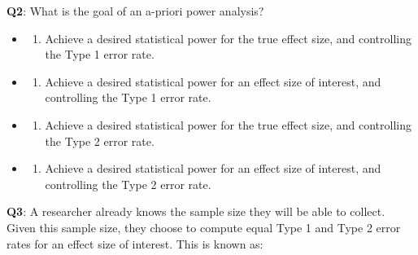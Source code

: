 \documentclass[
  letterpaper,
  DIV=11,
  numbers=noendperiod]{scrreprt}
\providecommand{\tightlist}{%
  \setlength{\itemsep}{0pt}\setlength{\parskip}{0pt}}\usepackage{longtable,booktabs,array}
\begin{document}
\textbf{Q2}: What is the goal of an a-priori power analysis?

\begin{itemize}
\item
  \begin{enumerate}
  \def\labelenumi{(\Alph{enumi})}
  \tightlist
  \item
    Achieve a desired statistical power for the true effect size, and
    controlling the Type 1 error rate.\\
  \end{enumerate}
\item
  \begin{enumerate}
  \def\labelenumi{(\Alph{enumi})}
  \setcounter{enumi}{1}
  \tightlist
  \item
    Achieve a desired statistical power for an effect size of interest,
    and controlling the Type 1 error rate.\\
  \end{enumerate}
\item
  \begin{enumerate}
  \def\labelenumi{(\Alph{enumi})}
  \setcounter{enumi}{2}
  \tightlist
  \item
    Achieve a desired statistical power for the true effect size, and
    controlling the Type 2 error rate.\\
  \end{enumerate}
\item
  \begin{enumerate}
  \def\labelenumi{(\Alph{enumi})}
  \setcounter{enumi}{3}
  \tightlist
  \item
    Achieve a desired statistical power for an effect size of interest,
    and controlling the Type 2 error rate.\\
  \end{enumerate}
\end{itemize}

\textbf{Q3}: A researcher already knows the sample size they will be
able to collect. Given this sample size, they choose to compute equal
Type 1 and Type 2 error rates for an effect size of interest. This is
known as:
\end{document}
